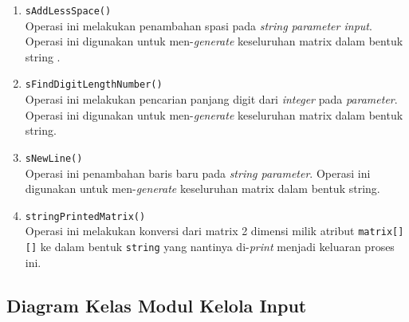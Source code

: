 \begin{enumerate}
\begin{enumerate}
\begin{itemize}
\begin{enumerate}
				\item \texttt{sAddLessSpace()}\\
				Operasi ini melakukan penambahan spasi pada \textit{string parameter input}. Operasi ini digunakan untuk men-\textit{generate} keseluruhan matrix dalam bentuk string	.
				
				\item \texttt{sFindDigitLengthNumber()}\\
				Operasi ini melakukan pencarian panjang digit dari \textit{integer} pada \textit{parameter}. Operasi ini digunakan untuk men-\textit{generate} keseluruhan matrix dalam bentuk string.
				
				\item \texttt{sNewLine()}\\
				Operasi ini penambahan baris baru pada \textit{string parameter}. Operasi ini digunakan untuk men-\textit{generate} keseluruhan matrix dalam bentuk string.
				
				\item \texttt{stringPrintedMatrix()}\\
				Operasi ini melakukan konversi dari matrix 2 dimensi milik atribut \texttt{matrix[][]} ke dalam bentuk \texttt{string} yang nantinya di-\textit{print} menjadi keluaran proses ini.
				
			\end{enumerate}					

		\end{itemize}
		
	\end{enumerate}
	
	
\end{enumerate}

\subsection{Diagram Kelas Modul Kelola Input}

